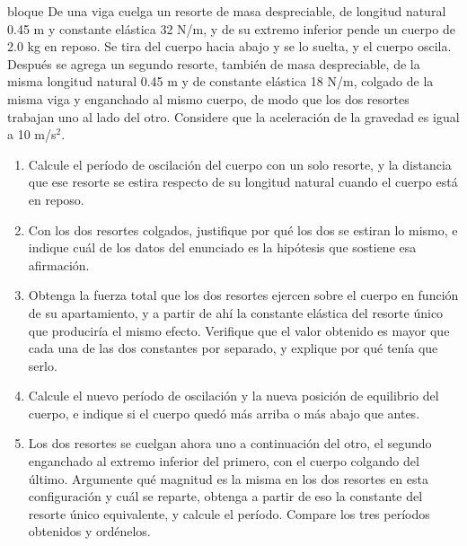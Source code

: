 \documentclass[11pt,openany]{book}
\begin{document}
\begin{ejercicio}{bloque}
De una viga cuelga un resorte de masa despreciable, de longitud natural 0.45 m y constante elástica 32 N/m, y de su extremo inferior pende un cuerpo de 2.0 kg en reposo. Se tira del cuerpo hacia abajo y se lo suelta, y el cuerpo oscila. Después se agrega un segundo resorte, también de masa despreciable, de la misma longitud natural 0.45 m y de constante elástica 18 N/m, colgado de la misma viga y enganchado al mismo cuerpo, de modo que los dos resortes trabajan uno al lado del otro. Considere que la aceleración de la gravedad es igual a 10 m/s$^2$.
\begin{enumerate}[label=(\alph*), leftmargin=1.7em, itemsep=1pt, topsep=3pt]
  \item Calcule el período de oscilación del cuerpo con un solo resorte, y la distancia que ese resorte se estira respecto de su longitud natural cuando el cuerpo está en reposo.
  \item Con los dos resortes colgados, justifique por qué los dos se estiran lo mismo, e indique cuál de los datos del enunciado es la hipótesis que sostiene esa afirmación.
  \item Obtenga la fuerza total que los dos resortes ejercen sobre el cuerpo en función de su apartamiento, y a partir de ahí la constante elástica del resorte único que produciría el mismo efecto. Verifique que el valor obtenido es mayor que cada una de las dos constantes por separado, y explique por qué tenía que serlo.
  \item Calcule el nuevo período de oscilación y la nueva posición de equilibrio del cuerpo, e indique si el cuerpo quedó más arriba o más abajo que antes.
  \item Los dos resortes se cuelgan ahora uno a continuación del otro, el segundo enganchado al extremo inferior del primero, con el cuerpo colgando del último. Argumente qué magnitud es la misma en los dos resortes en esta configuración y cuál se reparte, obtenga a partir de eso la constante del resorte único equivalente, y calcule el período. Compare los tres períodos obtenidos y ordénelos.
\end{enumerate}
\end{ejercicio}
\end{document}

